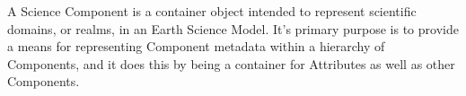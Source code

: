 %


A Science Component is a container object intended to represent scientific
domains, or realms, in an Earth Science Model.  It's primary purpose is to 
provide a means for representing Component metadata within a hierarchy of
Components, and it does this by being a container for Attributes as well 
as other Components.

